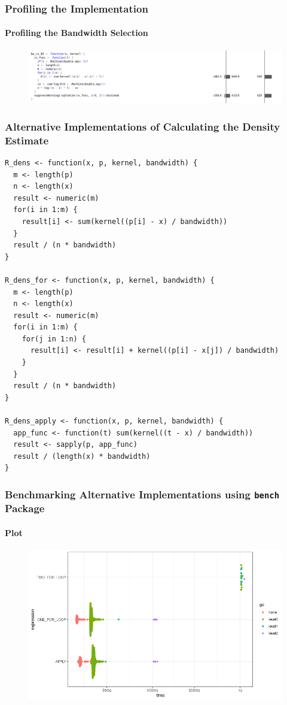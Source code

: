 \documentclass[aspectratio=169]{beamer}
\begin{document}
\begin{frame}[fragile]
  \frametitle{Profiling the Implementation}
  \framesubtitle{Profiling the Bandwidth Selection}
  \begin{figure}
    \centering
    \includegraphics[scale = 0.35]{figure/BW_profile.png}
  \end{figure}
\end{frame}
\begin{frame}[fragile]
  \frametitle{Alternative Implementations of Calculating the Density Estimate}
\begin{verbatim}
R_dens <- function(x, p, kernel, bandwidth) {
  m <- length(p)
  n <- length(x)
  result <- numeric(m)
  for(i in 1:m) {
    result[i] <- sum(kernel((p[i] - x) / bandwidth))
  }
  result / (n * bandwidth)
}

R_dens_for <- function(x, p, kernel, bandwidth) {
  m <- length(p)
  n <- length(x)
  result <- numeric(m)
  for(i in 1:m) {
    for(j in 1:n) {
      result[i] <- result[i] + kernel((p[i] - x[j]) / bandwidth)
    }
  }
  result / (n * bandwidth)
}

R_dens_apply <- function(x, p, kernel, bandwidth) {
  app_func <- function(t) sum(kernel((t - x) / bandwidth))
  result <- sapply(p, app_func)
  result / (length(x) * bandwidth)
}
\end{verbatim}
\end{frame}
\begin{frame}
  \frametitle{Benchmarking Alternative Implementations using \texttt{bench} Package}
  \framesubtitle{Plot}
  \begin{figure}
    \centering
    \includegraphics[scale = 0.5]{figure/ForVsApply.png}
  \end{figure}
\end{frame}
\end{document}
